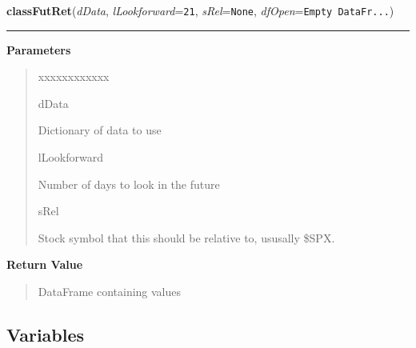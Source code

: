 \hspace{.8\funcindent}\begin{boxedminipage}{\funcwidth}

    \raggedright \textbf{classFutRet}(\textit{dData}, \textit{lLookforward}={\tt 21}, \textit{sRel}={\tt None}, \textit{dfOpen}={\tt Empty DataFr\texttt{...}})

    \vspace{-1.5ex}

    \rule{\textwidth}{0.5\fboxrule}
\setlength{\parskip}{2ex}
\setlength{\parskip}{1ex}
      \textbf{Parameters}
      \vspace{-1ex}

      \begin{quote}
        \begin{Ventry}{xxxxxxxxxxxx}

          \item[dData]

          Dictionary of data to use

          \item[lLookforward]

          Number of days to look in the future

          \item[sRel]

          Stock symbol that this should be relative to, ususally \$SPX.

        \end{Ventry}

      \end{quote}

      \textbf{Return Value}
    \vspace{-1ex}

      \begin{quote}
      DataFrame containing values

      \end{quote}

    \end{boxedminipage}



  \subsection{Variables}

